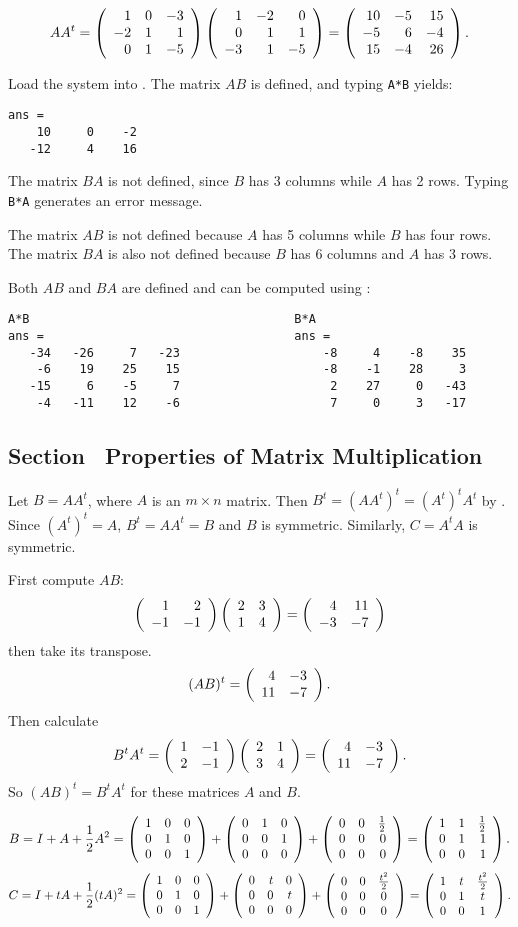 \documentclass{ximera}
\begin{document}
\[ AA^t = \left(\begin{array}{rrr} 1 & 0 & -3 \\ -2 & 1 & 1 \\ 0 & 1 & -5\end{array}\right)
\left(\begin{array}{rrr} 1 & -2 & 0 \\ 0 & 1 & 1 \\ -3 & 1 & -5\end{array}\right) =
\left(\begin{array}{rrr} 10 & -5 & 15 \\ -5 & 6 & -4 \\ 15 & -4 & 26\end{array}\right). \]



Load the system into \Matlabp.  The matrix $AB$ is defined,
and typing {\tt A*B} yields:
\begin{verbatim}
ans =
    10     0    -2
   -12     4    16
\end{verbatim}
The matrix $BA$ is not defined, since $B$ has 3 columns while $A$
has 2 rows.  Typing {\tt B*A} generates an error message.

 The matrix $AB$ is not defined because $A$ has 5 columns
while $B$ has four rows.  The matrix $BA$ is also not defined
because $B$ has 6 columns and $A$ has 3 rows.

 Both $AB$ and $BA$ are defined and can be computed using
\Matlabp :
\begin{verbatim}
A*B                                     B*A
ans =                                   ans =   
   -34   -26     7   -23                    -8     4    -8    35
    -6    19    25    15                    -8    -1    28     3
   -15     6    -5     7                     2    27     0   -43
    -4   -11    12    -6                     7     0     3   -17
\end{verbatim}

\subsection*{Section~\protect{\ref{S:4.7}} Properties of Matrix Multiplication}

  Let $B = AA^t$, where $A$ is an $m \times n$ matrix.
Then $B^t = (AA^t)^t = (A^t)^tA^t$ by .  Since
$(A^t)^t=A$, $B^t=AA^t=B$ and $B$ is symmetric.  Similarly, $C = A^tA$
is symmetric.

 First compute $AB$:
\[ \left(\begin{array}{rr} 1 & 2\\ -1 &-1\end{array}\right)\left(\begin{array}{rr} 2 & 3\\ 1 &4\end{array}\right) =
\left(\begin{array}{rr} 4 & 11\\ -3 &-7\end{array}\right) \]
then take its transpose.
\[ (AB)^t = \left(\begin{array}{rr} 4 & -3\\ 11 &-7\end{array}\right). \]
Then calculate
\[ B^tA^t = \left(\begin{array}{rr} 1 & -1\\ 2 &-1\end{array}\right)\left(\begin{array}{rr} 2 & 1\\ 3 &4\end{array}\right) =
\left(\begin{array}{rr} 4 & -3\\ 11 &-7\end{array}\right). \]
So $(AB)^t = B^tA^t$ for these matrices $A$ and $B$.

\[ 
B = I + A + \frac{1}{2}A^2 =
 \left(\begin{array}{rrr} 1 & 0 & 0 \\ 0 & 1 & 0 \\ 0 & 0 & 1\end{array}\right) +
\left(\begin{array}{rrr} 0 & 1 & 0 \\ 0 & 0 & 1 \\ 0 & 0 & 0\end{array}\right) +
\left(\begin{array}{rrr} 0 & 0 & \frac{1}{2} \\ 0 & 0 & 0 \\ 0 & 0 & 0\end{array}\right)
= \left(\begin{array}{rrr} 1 & 1 & \frac{1}{2} \\ 0 & 1 & 1 \\ 0 & 0 & 1\end{array}\right). \]
\[ 
C = I + tA + \frac{1}{2}(tA)^2 
= \left(\begin{array}{rrr} 1 & 0 & 0 \\ 0 & 1 & 0 \\ 0 & 0 & 1\end{array}\right) +
\left(\begin{array}{rrr} 0 & t & 0 \\ 0 & 0 & t \\ 0 & 0 & 0\end{array}\right) +
\left(\begin{array}{ccc} 0 & 0 & \frac{t^2}{2} \\ 0 & 0 & 0 \\ 0 & 0 & 0\end{array}\right)
= \left(\begin{array}{ccc} 1 & t & \frac{t^2}{2} \\ 0 & 1 & t \\ 0 & 0 & 1\end{array}\right). \]
\end{document}
